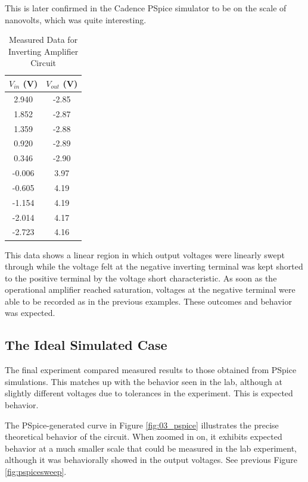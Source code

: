 \documentclass[12pt]{article}
\begin{document}
This is later confirmed in the Cadence PSpice simulator to be on the scale of
nanovolts, which was quite interesting.
\begin{table}[H]
	\centering
	\begin{tabular}{|c|c|}
		\hline
		$V_{in}$ (V) & $V_{out}$ (V) \\
		\hline
		2.940        & -2.85         \\
		1.852        & -2.87         \\
		1.359        & -2.88         \\
		0.920        & -2.89         \\
		0.346        & -2.90         \\
		-0.006       & 3.97          \\
		-0.605       & 4.19          \\
		-1.154       & 4.19          \\
		-2.014       & 4.17          \\
		-2.723       & 4.16          \\
		\hline
	\end{tabular}
	\caption{Measured Data for Inverting Amplifier Circuit}
	\label{tab:inverting_amp}
\end{table}
This data shows a linear region in which output voltages were linearly swept
through while the voltage felt at the negative inverting terminal was kept
shorted to the positive terminal by the voltage short characteristic. As soon as
the operational amplifier reached saturation, voltages at the negative terminal
were able to be recorded as in the previous examples. These outcomes and
behavior was expected.

\subsection{The Ideal Simulated Case}
The final experiment compared measured results to those obtained from PSpice
simulations. This matches up with the behavior seen in the lab, although at
slightly different voltages due to tolerances in the experiment. This is
expected behavior.

The PSpice-generated curve in Figure \ref{fig:03_pspice} illustrates the precise
theoretical behavior of the circuit. When zoomed in on, it exhibits expected
behavior at a much smaller scale that could be measured in the lab experiment,
although it was behaviorally showed in the output voltages. See previous Figure
\ref{fig:pspicesweep}.
\end{document}

